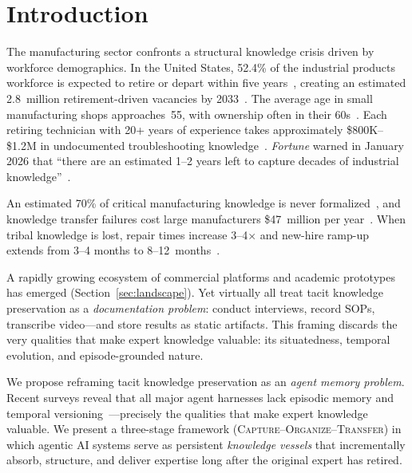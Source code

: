 \documentclass[]{ceurart}
\begin{document}
\section{Introduction}\label{sec:intro}

The manufacturing sector confronts a structural knowledge crisis driven
by workforce demographics. In the United States, 52.4\% of the
industrial products workforce is expected to retire or depart within
five years~\cite{apqc2025}, creating an estimated 2.8~million
retirement-driven vacancies by 2033~\cite{deloitte2024}. The average age
in small manufacturing shops approaches~55, with ownership often in
their 60s~\cite{edwards2026}. Each retiring technician with 20+ years of
experience takes approximately \$800K--\$1.2M in undocumented
troubleshooting knowledge~\cite{dovient2025}. \emph{Fortune} warned in
January 2026 that ``there are an estimated 1--2 years left to capture
decades of industrial knowledge''~\cite{fortune2026}.

An estimated 70\% of critical manufacturing knowledge is never
formalized~\cite{egain2025}, and knowledge transfer failures cost large
manufacturers \$47~million per year~\cite{panopto2023}. When tribal
knowledge is lost, repair times increase 3--4$\times$ and new-hire
ramp-up extends from 3--4 months to
8--12~months~\cite{dovient2025}.

A rapidly growing ecosystem of commercial platforms and academic
prototypes has emerged (Section~\ref{sec:landscape}). Yet virtually all
treat tacit knowledge preservation as a \emph{documentation problem}:
conduct interviews, record SOPs, transcribe video---and store results as
static artifacts. This framing discards the very qualities that make
expert knowledge valuable: its situatedness, temporal evolution, and
episode-grounded nature.

We propose reframing tacit knowledge preservation as an \emph{agent
memory problem}. Recent surveys reveal that all major agent harnesses
lack episodic memory and temporal
versioning~\cite{banf2026memory}---precisely the qualities that make
expert knowledge valuable. We present a three-stage framework
(\textsc{Capture}--\textsc{Organize}--\textsc{Transfer}) in which
agentic AI systems serve as persistent \emph{knowledge vessels} that
incrementally absorb, structure, and deliver expertise long after the
original expert has retired.
\end{document}
